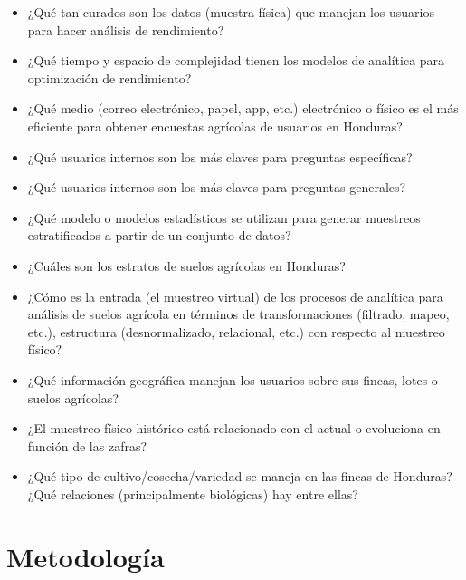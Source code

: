 \documentclass{report}
\begin{document}
\begin{itemize}
    \item ¿Qué tan curados son los datos (muestra física) que manejan los usuarios para hacer análisis de rendimiento?
    
    \item ¿Qué tiempo y espacio de complejidad tienen los modelos de analítica para optimización de rendimiento?
    
    \item ¿Qué medio (correo electrónico, papel, app, etc.) electrónico o físico es el más eficiente para obtener encuestas agrícolas de usuarios en Honduras?
    
    \item ¿Qué usuarios internos son los más claves para preguntas específicas?
    
    \item ¿Qué usuarios internos son los más claves para preguntas generales?
    
    \item ¿Qué modelo o modelos estadísticos se utilizan para generar muestreos estratificados a partir de un conjunto de datos?
    
    \item ¿Cuáles son los estratos de suelos agrícolas en Honduras?
    
    \item ¿Cómo es la entrada (el muestreo virtual) de los procesos de analítica para análisis de suelos agrícola en términos de transformaciones (filtrado, mapeo, etc.), estructura (desnormalizado, relacional, etc.) con respecto al muestreo físico?
    
    \item ¿Qué información geográfica manejan los usuarios sobre sus fincas, lotes o suelos agrícolas?
    
    \item ¿El muestreo físico histórico está relacionado con el actual o evoluciona en función de las zafras?
    
    \item ¿Qué tipo de cultivo/cosecha/variedad se maneja en las fincas de Honduras? ¿Qué relaciones (principalmente biológicas) hay entre ellas?
\end{itemize}


\section{Metodología}
\end{document}
